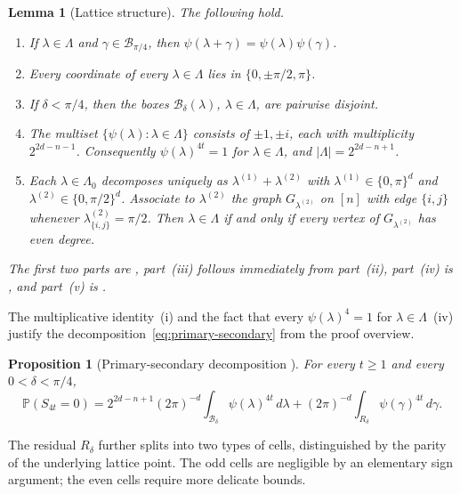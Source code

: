 \documentclass[11pt]{article}
\newtheorem{proposition}[theorem]{Proposition}
\newtheorem{lemma}[theorem]{Lemma}
\theoremstyle{definition}
\newcommand{\Prb}{\mathbb{P}}
\newcommand{\Bbox}{\mathcal{B}}
\begin{document}
\begin{lemma}[Lattice structure]\label{fact:lambda-facts}
The following hold.
\begin{enumerate}[label=(\roman*),nosep]
\item If \(\lambda\in\Lambda\) and \(\gamma\in\Bbox_{\pi/4}\), then
\(\psi(\lambda+\gamma)=\psi(\lambda)\psi(\gamma)\).
\item Every coordinate of every \(\lambda\in\Lambda\) lies in \(\{0,\pm\pi/2,\pi\}\).
\item If \(\delta<\pi/4\), then the boxes \(\Bbox_\delta(\lambda)\), \(\lambda\in\Lambda\), are pairwise disjoint.
\item The multiset \(\{\psi(\lambda):\lambda\in\Lambda\}\) consists of \(\pm1,\pm i\),
each with multiplicity \(2^{2d-n-1}\). Consequently \(\psi(\lambda)^{4t}=1\) for
\(\lambda\in\Lambda\), and \(|\Lambda|=2^{2d-n+1}\).
\item Each \(\lambda\in\Lambda_0\) decomposes uniquely as \(\lambda^{(1)}+\lambda^{(2)}\) with \(\lambda^{(1)}\in\{0,\pi\}^d\) and \(\lambda^{(2)}\in\{0,\pi/2\}^d\). Associate to \(\lambda^{(2)}\) the graph \(G_{\lambda^{(2)}}\) on \([n]\) with edge \(\{i,j\}\) whenever \(\lambda^{(2)}_{\{i,j\}}=\pi/2\). Then \(\lambda\in\Lambda\) if and only if every vertex of \(G_{\lambda^{(2)}}\) has even degree.
\end{enumerate}
The first two parts are \cite[Lemma~2.2]{DL10}, part~(iii) follows immediately from part~(ii), part~(iv) is \cite[Lemma~2.3]{DL10}, and part~(v) is \cite[Lemma~2.4]{DL10}.
\end{lemma}

The multiplicative identity~(i) and the fact that every \(\psi(\lambda)^4=1\) for \(\lambda\in\Lambda\)~(iv) justify the decomposition~\eqref{eq:primary-secondary} from the proof overview.

\begin{proposition}[Primary-secondary decomposition {\cite[Proposition~2.1]{DL10}}]\label{prop:primary-secondary}
For every \(t\ge 1\) and every \(0<\delta<\pi/4\),
\[
  \Prb(S_{4t}=0)
  =
  2^{2d-n+1}(2\pi)^{-d}\int_{\Bbox_\delta}\psi(\lambda)^{4t}\,d\lambda
  +(2\pi)^{-d}\int_{R_\delta}\psi(\gamma)^{4t}\,d\gamma.
\]
\end{proposition}

The residual \(R_\delta\) further splits into two types of cells, distinguished by the parity of the underlying lattice point. The odd cells are negligible by an elementary sign argument; the even cells require more delicate bounds.
\end{document}
